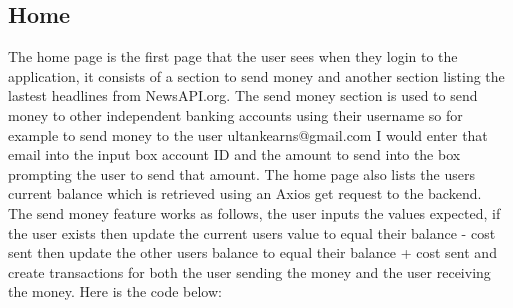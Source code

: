 \subsection{Home}
The home page is the first page that the user sees when they login to the application, it consists of a section to send money and another section listing the lastest headlines from NewsAPI.org.  The send money section is used to send money to other independent banking accounts using their username so for example to send money to the user ultankearns@gmail.com I would enter that email into the input box account ID and the amount to send into the box prompting the user to send that amount.  The home page also lists the users current balance which is retrieved using an Axios get request to the backend.
\\
The send money feature works as follows, the user inputs the values expected, if the user exists then update the current users value to equal their balance - cost sent then update the other users balance to equal their balance + cost sent and create transactions for both the user sending the money and the user receiving the money.  Here is the code below:
